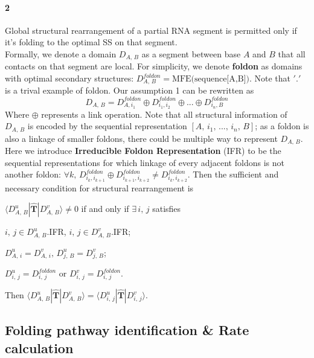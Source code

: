 \documentclass[11pt, a4paper]{article}
\begin{document}
\paragraph{2} Global structural rearrangement of a partial RNA segment is permitted only if it's folding to the optimal SS on that segment.
\\

Formally, we denote a domain $D_{A,\,B}$ as a segment between base $A$ and $B$ that all contacts on that segment are local. For simplicity, we denote \textbf{foldon}
as domains with optimal secondary structures: $D^{foldon}_{A,\,B} = \text{MFE(sequence[A,B])}$. Note that $'.'$ is a trival example of foldon.
Our assumption 1 can be rewritten as
\begin{equation}
  D_{A,\,B} = D^{foldon}_{A, i_1} \oplus D^{foldon}_{i_1, i_2} \oplus ... \oplus D^{foldon}_{i_n, B}
\end{equation}
Where $\oplus$ represents a link operation. Note that all structural information of $D_{A,\,B}$ is encoded by the sequential representation $[A,\, i_1,\, ...,\, i_n,\, B]$;
 as a foldon is also a linkage of smaller foldons, there could be multiple way to represent $D_{A,\,B}$. Here we introduce \textbf{Irreducible Foldon Representation} (IFR) to be the
 sequential representations for which linkage of every adjacent foldons is not another foldon: $\forall k,\, D^{foldon}_{i_k, i_{k+1}} \oplus D^{foldon}_{i_{k+1}, i_{k+2}} \neq D^{foldon}_{i_{k}, i_{k+2}}$.
 Then the sufficient and necessary condition for structural rearrangement is

\begin{center}
  $\langle D^{u}_{A,\,B} | \hat{\mathbf{T}} | D^{v}_{A,\,B} \rangle \neq 0$ if and only if $\exists\, i,\,j$ satisfies

  $i,\,j \in D^{u}_{A,\,B}$.IFR, $i,\,j \in D^{v}_{A,\,B}$.IFR;

  $D^{u}_{A,\,i} = D^{v}_{A,\,i},\, D^{u}_{j,\,B} = D^{v}_{j,\,B}$;

  $D^{u}_{i,\,j} = D^{foldon}_{i,\,j}$ or $D^{v}_{i,\,j} = D^{foldon}_{i,\,j}$.

  Then $\langle D^{u}_{A,\,B} | \hat{\mathbf{T}} | D^{v}_{A,\,B} \rangle = \langle D^{u}_{i,\,j} | \hat{\mathbf{T}} | D^{v}_{i,\,j} \rangle$.
\end{center}

\subsection{Folding pathway identification \& Rate calculation} \label{section:rate}
\end{document}
